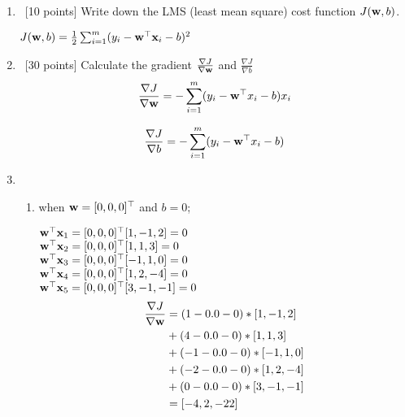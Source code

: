 \documentclass[12pt, fullpage,letterpaper]{article}
\begin{document}
\begin{enumerate}
\item~[10 points] Write down the LMS (least mean square) cost function $J({\bf w}, b)$.

    $J({\bf w}, b) = \frac{1}{2} \sum_{i=1}^m(y_i - {\bf w}^\top{\bf x}_{i} - b)^2$

\item~[30 points] Calculate the gradient $\frac{\nabla J}{\nabla {\bf w}}$ and $\frac{\nabla J}{\nabla b}$
\[
    \frac{\nabla J}{\nabla {\bf w}} = - \sum^m_{i=1}(y_i - {\bf w}^\top x_i - b)x_i
\]

\[
    \frac{\nabla J}{\nabla b} = - \sum^m_{i=1}(y_i - {\bf w}^\top x_i - b)
\]
\item \begin{enumerate}


\item when ${\bf w} = [0,0,0]^\top$ and $b = 0$;



    ${\bf w}^\top {\bf x}_1 = [0, 0, 0]^\top[1, -1, 2] = 0$ \\
    ${\bf w}^\top {\bf x}_2 = [0, 0, 0]^\top[1, 1, 3] = 0$  \\
    ${\bf w}^\top {\bf x}_3 = [0, 0, 0]^\top[-1, 1, 0] = 0$ \\
    ${\bf w}^\top {\bf x}_4 = [0, 0, 0]^\top[1, 2, -4] = 0$ \\
    ${\bf w}^\top {\bf x}_5 = [0, 0, 0]^\top[3, -1, -1] = 0$ \\

\begin{align*}
    \frac{\nabla J}{\nabla {\bf w}} &=
    (1 - 0.0 - 0) * [ 1, -1,  2]\\
    &+ (4 - 0.0 - 0) * [1, 1, 3]\\
    &+ (-1 - 0.0 - 0) * [-1,  1,  0]\\
    &+ (-2 - 0.0 - 0) * [ 1,  2, -4]\\
    &+ (0 - 0.0 - 0) * [ 3, -1, -1]\\
    &= [ -4,   2, -22]
\end{align*}


\end{enumerate}
\end{enumerate}
\end{document}
